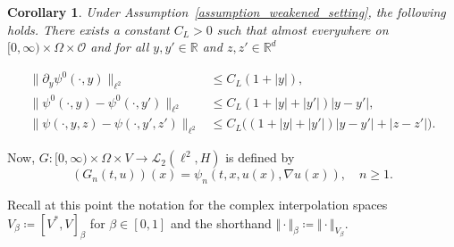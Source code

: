 \documentclass[reqno]{amsart}
\newtheorem{corollary}[Satz]{Corollary}
\newcommand{\R}{\mathbb{R}}
\newcommand{\sL}{\mathscr{L}}
\newcommand{\sO}{\mathscr{O}}
\newcommand{\ce}{\coloneqq}
\newcommand{\1}{\mathbf{1}}
\begin{document}
\begin{corollary} \label{cor:weakened_noise_consequences}
    Under Assumption~\ref{assumption_weakened_setting}, the following holds. There exists a constant $C_L > 0$ such that almost everywhere on $[0, \infty) \times \Omega \times \sO$ and for all $y, y' \in \R$ and $z, z' \in \R^d$ 

    \begin{align}
        \|\partial_y\psi^0(\cdot,y)\|_{\ell^2} &\leq C_L(1+|y|), \label{eq:corNoiseDerivativeGrowth}\\
        \|\psi^0(\cdot,y)-\psi^0(\cdot,y')\|_{\ell^2} & \leq C_L(1+|y|+|y'|)|y-y'|, \label{eq:corNoiseLocalLipschitz}\\
        \|\psi(\cdot,y,z)-\psi(\cdot,y',z')\|_{\ell^2} & \leq C_L\Big((1+|y|+|y'|)|y-y'|+|z-z'|\Big). \label{eq:corFullNoiseLocalLipschitz}
    \end{align}
\end{corollary}

Now, $G:[0,\infty)\times \Omega \times V \to \sL_2(\ell^2,H)$ is defined by 
\begin{equation}\label{eq:def_G}
    (G_n(t,u))(x)=\psi_n(t,x,u(x),\nabla u(x)),\quad n\ge 1. 
\end{equation}

Recall at this point the notation for the complex interpolation spaces $V_{\beta} \ce  [V^{\ast}, V]_{\beta}$ for $\beta \in [0,1]$ and the shorthand $\Vert \cdot \Vert_{\beta} \ce  \Vert \cdot \Vert_{V_{\beta}}$.
\end{document}
